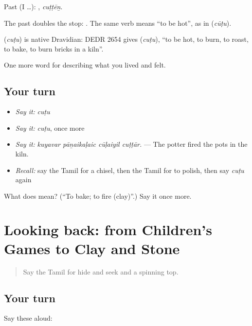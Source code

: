Past (I …): , \emph{cuṭṭēṉ}.

The past doubles the stop: . The same verb means \textquotedblleft{}to be hot\textquotedblright{}, as in  (\emph{cūṭu}).

\begin{cousinweb}
\textbf{} (\emph{cuṭu}) is native Dravidian: DEDR 2654 gives  (\emph{cuṭu}), \textquotedblleft{}to be hot, to burn, to roast, to bake, to burn bricks in a kiln\textquotedblright{}.
\end{cousinweb}

\begin{grammarlens}[title={What you've built}]
One more word for describing what you lived and felt.
\end{grammarlens}

\subsection*{Your turn}
\begin{itemize}
\raggedright
  \item \emph{Say it:} \emph{cuṭu}
  \item \emph{Say it:} \emph{cuṭu}, once more
  \item \emph{Say it:} \emph{kuyavar pāṉaikaḷaic cūḷaiyil cuṭṭār.} — The potter fired the pots in the kiln.
  \item \emph{Recall:} say the Tamil for a chisel, then the Tamil for to polish, then say \emph{cuṭu} again
\end{itemize}

\begin{tcolorbox}[breakable,colback=teal!4,colframe=teal!35!black,title={Before you move on}]
What does  mean? (\textquotedblleft{}To bake; to fire (clay)\textquotedblright{}.) Say it once more.
\end{tcolorbox}
\section[(dialogue)]{Looking back: from Children's Games to Clay and Stone}

\label{lesson:TA-R537-review-530-537}



\begin{quote}
Say the Tamil for hide and seek and a spinning top.
\end{quote}

\subsection*{Your turn}
Say these aloud:

